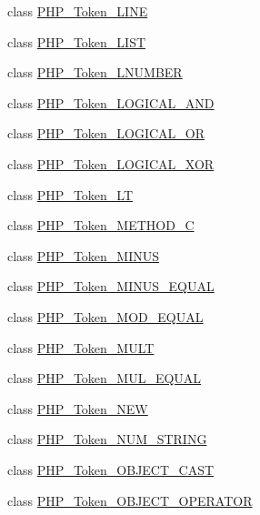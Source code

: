 \begin{DoxyCompactItemize}
\item 
class \mbox{\hyperlink{class_p_h_p___token___l_i_n_e}{P\+H\+P\+\_\+\+Token\+\_\+\+L\+I\+NE}}
\item 
class \mbox{\hyperlink{class_p_h_p___token___l_i_s_t}{P\+H\+P\+\_\+\+Token\+\_\+\+L\+I\+ST}}
\item 
class \mbox{\hyperlink{class_p_h_p___token___l_n_u_m_b_e_r}{P\+H\+P\+\_\+\+Token\+\_\+\+L\+N\+U\+M\+B\+ER}}
\item 
class \mbox{\hyperlink{class_p_h_p___token___l_o_g_i_c_a_l___a_n_d}{P\+H\+P\+\_\+\+Token\+\_\+\+L\+O\+G\+I\+C\+A\+L\+\_\+\+A\+ND}}
\item 
class \mbox{\hyperlink{class_p_h_p___token___l_o_g_i_c_a_l___o_r}{P\+H\+P\+\_\+\+Token\+\_\+\+L\+O\+G\+I\+C\+A\+L\+\_\+\+OR}}
\item 
class \mbox{\hyperlink{class_p_h_p___token___l_o_g_i_c_a_l___x_o_r}{P\+H\+P\+\_\+\+Token\+\_\+\+L\+O\+G\+I\+C\+A\+L\+\_\+\+X\+OR}}
\item 
class \mbox{\hyperlink{class_p_h_p___token___l_t}{P\+H\+P\+\_\+\+Token\+\_\+\+LT}}
\item 
class \mbox{\hyperlink{class_p_h_p___token___m_e_t_h_o_d___c}{P\+H\+P\+\_\+\+Token\+\_\+\+M\+E\+T\+H\+O\+D\+\_\+C}}
\item 
class \mbox{\hyperlink{class_p_h_p___token___m_i_n_u_s}{P\+H\+P\+\_\+\+Token\+\_\+\+M\+I\+N\+US}}
\item 
class \mbox{\hyperlink{class_p_h_p___token___m_i_n_u_s___e_q_u_a_l}{P\+H\+P\+\_\+\+Token\+\_\+\+M\+I\+N\+U\+S\+\_\+\+E\+Q\+U\+AL}}
\item 
class \mbox{\hyperlink{class_p_h_p___token___m_o_d___e_q_u_a_l}{P\+H\+P\+\_\+\+Token\+\_\+\+M\+O\+D\+\_\+\+E\+Q\+U\+AL}}
\item 
class \mbox{\hyperlink{class_p_h_p___token___m_u_l_t}{P\+H\+P\+\_\+\+Token\+\_\+\+M\+U\+LT}}
\item 
class \mbox{\hyperlink{class_p_h_p___token___m_u_l___e_q_u_a_l}{P\+H\+P\+\_\+\+Token\+\_\+\+M\+U\+L\+\_\+\+E\+Q\+U\+AL}}
\item 
class \mbox{\hyperlink{class_p_h_p___token___n_e_w}{P\+H\+P\+\_\+\+Token\+\_\+\+N\+EW}}
\item 
class \mbox{\hyperlink{class_p_h_p___token___n_u_m___s_t_r_i_n_g}{P\+H\+P\+\_\+\+Token\+\_\+\+N\+U\+M\+\_\+\+S\+T\+R\+I\+NG}}
\item 
class \mbox{\hyperlink{class_p_h_p___token___o_b_j_e_c_t___c_a_s_t}{P\+H\+P\+\_\+\+Token\+\_\+\+O\+B\+J\+E\+C\+T\+\_\+\+C\+A\+ST}}
\item 
class \mbox{\hyperlink{class_p_h_p___token___o_b_j_e_c_t___o_p_e_r_a_t_o_r}{P\+H\+P\+\_\+\+Token\+\_\+\+O\+B\+J\+E\+C\+T\+\_\+\+O\+P\+E\+R\+A\+T\+OR}}

\end{DoxyCompactItemize}

